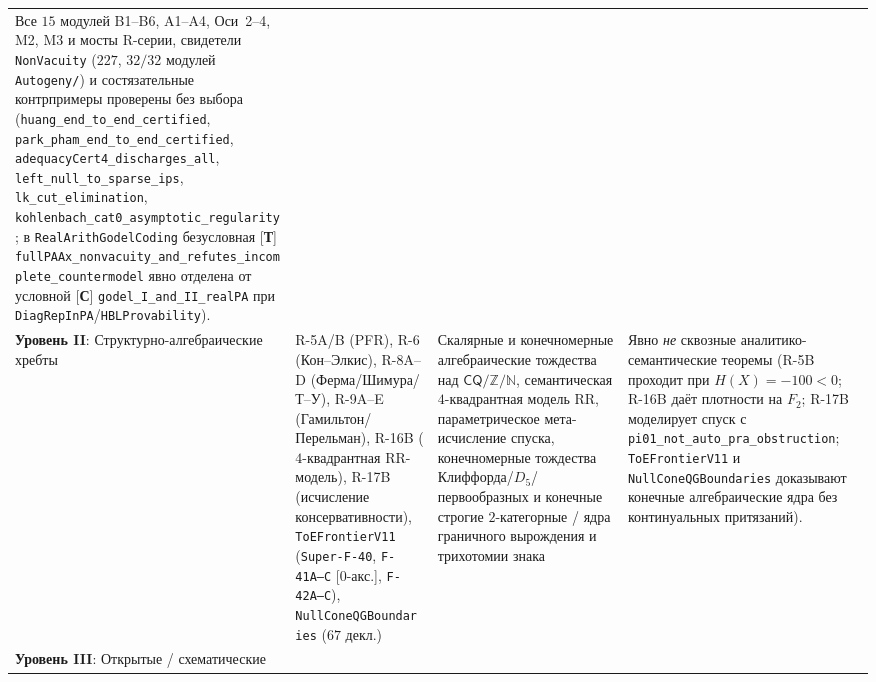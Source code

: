 \documentclass[11pt]{article}
\theoremstyle{plain}
\theoremstyle{definition}
\begin{document}
\begin{center}
\begin{tabular}{@{} >{\raggedright\arraybackslash}p{2.3cm} >{\raggedright\arraybackslash}p{3.9cm} >{\raggedright\arraybackslash}p{3.9cm} >{\raggedright\arraybackslash}p{3.9cm} @{}}
Все $15$ модулей B1--B6, A1--A4, Оси~2--4, M2, M3 и мосты R-серии, свидетели \texttt{NonVacuity} ($227$, $32/32$ модулей \texttt{Autogeny/}) и состязательные контрпримеры проверены без выбора (\texttt{huang\_\allowbreak end\_\allowbreak to\_\allowbreak end\_\allowbreak certified}, \texttt{park\_\allowbreak pham\_\allowbreak end\_\allowbreak to\_\allowbreak end\_\allowbreak certified}, \texttt{adequacyCert4\_\allowbreak discharges\_\allowbreak all}, \texttt{left\_\allowbreak null\_\allowbreak to\_\allowbreak sparse\_\allowbreak ips}, \texttt{lk\_\allowbreak cut\_\allowbreak elimination}, \texttt{kohlenbach\_\allowbreak cat0\_\allowbreak asymptotic\_\allowbreak regularity}; в \texttt{RealArith\allowbreak GodelCoding} безусловная \textup{[\textbf{Т}]} \texttt{fullPAAx\_\allowbreak nonvacuity\_\allowbreak and\_\allowbreak refutes\_\allowbreak incomplete\_\allowbreak countermodel} явно отделена от условной \textup{[\textbf{С}]} \texttt{godel\_\allowbreak I\_\allowbreak and\_\allowbreak II\_\allowbreak realPA} при \texttt{DiagRepInPA}/\allowbreak\texttt{HBLProvability}). \\ \addlinespace[3pt]
\textbf{Уровень II}: Структурно-алгебраические хребты &
R-5A/B (PFR), R-6 (Кон--Элкис), R-8A--D (Ферма/Шимура/Т--У), R-9A--E (Гамильтон/Перельман), R-16B ($4$-квадрантная RR-модель), R-17B (исчисление консервативности), \texttt{ToEFrontier\allowbreak V11} (\texttt{Super-F-40}, \texttt{F-41A--C} [$0$-акс.], \texttt{F-42A--C}), \texttt{NullCone\allowbreak QGBoundaries} ($67$ декл.) &
Скалярные и конечномерные алгебраические тождества над $\mathsf{CQ}/\mathbb{Z}/\mathbb{N}$, семантическая $4$-квадрантная модель RR, параметрическое мета-исчисление спуска, конечномерные тождества Клиффорда\slash $D_5$\slash первообразных и конечные строгие $2$-категорные / ядра граничного вырождения и трихотомии знака &
Явно \emph{не} сквозные аналитико-семантические теоремы (R-5B проходит при $H(X)=-100 < 0$; R-16B даёт плотности на $F_2$; R-17B моделирует спуск с \texttt{pi01\_\allowbreak not\_\allowbreak auto\_\allowbreak pra\_\allowbreak obstruction}; \texttt{ToEFrontier\allowbreak V11} и \texttt{NullCone\allowbreak QGBoundaries} доказывают конечные алгебраические ядра без континуальных притязаний). \\ \addlinespace[3pt]
\textbf{Уровень III}: Открытые / схематические &

\end{tabular}
\end{center}
\end{document}
